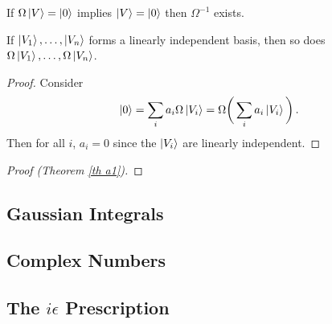\begin{theorem}\label{th a1}
If $\Omega \ket{V} = \ket{0}$ implies $\ket{V} = \ket{0}$ then $\Omega^{-1}$ exists.
\end{theorem}

\begin{lemma}\label{linear operator on linearly independent basis}
If $\ket{V_1}, \dots, \ket{V_n}$ forms a linearly independent basis, then so does $\Omega\ket{V_1}, \dots, \Omega\ket{V_n}$.
\end{lemma}

\begin{proof}
Consider
\[ \ket{0} = \sum_i a_i\Omega\ket{V_i} = \Omega \bigg{(}\sum_i a_i\ket{V_i}\bigg{)}\,. \]
Then for all $i$, $a_i = 0$ since the $\ket{V_i}$ are linearly independent.
\end{proof}

\begin{proof}[Proof (Theorem \eqref{th a1})]

\end{proof}

\subsection{Gaussian Integrals}

\subsection{Complex Numbers}

\subsection[The Principle Value Integral]{The $i\epsilon$ Prescription}
